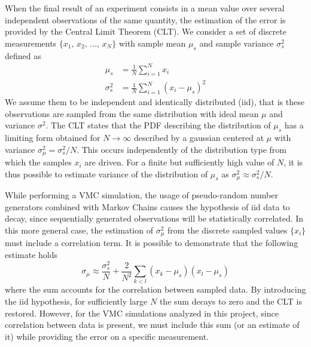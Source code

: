 When the final result of an experiment consists in a mean value over several independent observations of the same quantity, the estimation of the error is provided by the Central Limit Theorem (CLT). We consider a set of discrete measurements $\{x_1,\,x_2,\,\dots, \, x_N\}$ with sample mean $\mu_s$ and sample variance $\sigma_s^2$ defined as
\begin{align*}
    \mu_s &= \frac{1}{N} \sum_{i=1}^N x_i \\
    \sigma_s^2 &= \frac{1}{N} \sum_{i=1}^N (x_i - \mu_s)^2
\end{align*}
We assume them to be independent and identically distributed (iid), that is these observations are sampled from the same distribution with ideal mean $\mu$ and variance $\sigma^2$. The CLT states that the PDF describing the distribution of $\mu_s$ has a limiting form obtained for $N\rightarrow \infty$ described by a gaussian centered at $\mu$ with variance $\sigma_\mu^2 = \sigma_s^2/N$. This occurs independently of the distribution type from which the samples $x_i$ are driven. For a finite but sufficiently high value of $N$, it is thus possible to estimate variance of the distribution of $\mu_s$ as $\sigma_\mu^2 \approx \sigma_s^2/N$.

While performing a VMC simulation, the usage of pseudo-random number generators combined with Markov Chains causes the hypothesis of iid data to decay, since sequentially generated observations will be  statistically correlated. In this more general case, the estimation of $\sigma_\mu^2$ from the discrete sampled values $\{ x_i \}$ must include a correlation term. It is possible to demonstrate that the following estimate holds
\begin{equation}
    \sigma_\mu \approx \frac{\sigma_s^2}{N} + \frac{2}{N^2} \sum_{k<l} (x_k - \mu_s) (x_l - \mu_s)  
    \label{err_covariance}
\end{equation}
where the sum accounts for the correlation between sampled data. By introducing the iid hypothesis, for sufficiently large $N$ the sum decays to zero and the CLT is restored. However, for the VMC simulations analyzed in this project, since correlation between data is present, we must include this sum (or an estimate of it) while providing the error on a specific measurement.



